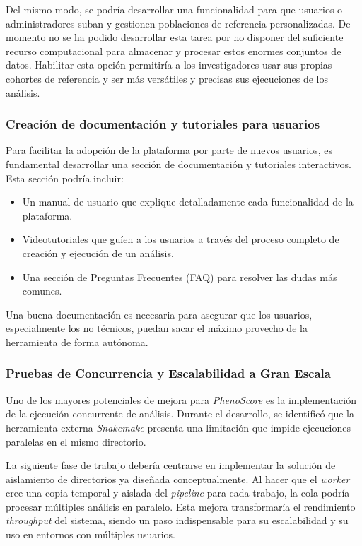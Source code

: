 Del mismo modo, se podría desarrollar una funcionalidad para que usuarios o administradores suban y gestionen poblaciones de referencia personalizadas. De momento no se ha podido desarrollar esta tarea por no disponer del suficiente recurso computacional para almacenar y procesar estos enormes conjuntos de datos. Habilitar esta opción permitiría a los investigadores usar sus propias cohortes de referencia y ser más versátiles y precisas sus ejecuciones de los análisis.

\subsubsection{Creación de documentación y tutoriales para usuarios}
Para facilitar la adopción de la plataforma por parte de nuevos usuarios, es fundamental desarrollar una sección de documentación y tutoriales interactivos. Esta sección podría incluir:
\begin{itemize}
\item Un manual de usuario que explique detalladamente cada funcionalidad de la plataforma.
\item Videotutoriales que guíen a los usuarios a través del proceso completo de creación y ejecución de un análisis.
\item Una sección de Preguntas Frecuentes (FAQ) para resolver las dudas más comunes.
\end{itemize}
Una buena documentación es necesaria para asegurar que los usuarios, especialmente los no técnicos, puedan sacar el máximo provecho de la herramienta de forma autónoma.

\subsubsection{Pruebas de Concurrencia y Escalabilidad a Gran Escala}
Uno de los mayores potenciales de mejora para \textit{PhenoScore} es la implementación de la ejecución concurrente de análisis. Durante el desarrollo, se identificó que la herramienta externa \textit{Snakemake} presenta una limitación que impide ejecuciones paralelas en el mismo directorio.

La siguiente fase de trabajo debería centrarse en implementar la solución de aislamiento de directorios ya diseñada conceptualmente. Al hacer que el \textit{worker} cree una copia temporal y aislada del \textit{pipeline} para cada trabajo, la cola podría procesar múltiples análisis en paralelo. Esta mejora transformaría el rendimiento \textit{throughput} del sistema, siendo un paso indispensable para su escalabilidad y su uso en entornos con múltiples usuarios.



